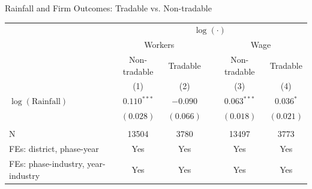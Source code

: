 \begin{frame}{Rainfall and Firm Outcomes: Tradable vs. Non-tradable}
{\begin{table}[h!]
\begin{center}
\begin{tabular}{lccccc}
                & \multicolumn{5}{c}{$\log(\cdot)$} \\ \cline{2-6}
                & \multicolumn{2}{c}{Workers} & & \multicolumn{2}{c}{Wage}\\ \cline{2-3} \cline{5-6}
                & Non-tradable & Tradable & & Non-tradable & Tradable \\
                & (1) & (2) & & (3) & (4)\\
                \hline
                $\log(\text{Rainfall})$ & \textcolor{citrine}{$0.110^{***}$} & \textcolor{citrine}{$-0.090$} & & \textcolor{citrine}{$0.063^{***}$} & \textcolor{citrine}{$\boxed{0.036^*}$} \\
                 & $(0.028)$ & $(0.066)$& & $(0.018)$& $(0.021)$\\
                 &\\
                 N & 13504 & 3780 & & 13497 & 3773 \\
                 FEs: district, phase-year & Yes & Yes & & Yes & Yes\\
                 FEs: phase-industry, year-industry & Yes &Yes & &Yes &Yes
                \end{tabular}
            \end{center}
        \end{table}
    }

 \end{frame}

